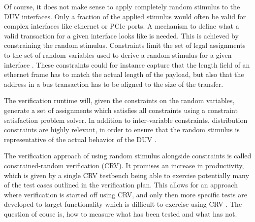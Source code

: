 Of course, it does not make sense to apply completely random stimulus to the DUV interfaces. Only a fraction of the
applied stimulus would often be valid for complex interfaces like ethernet or PCIe ports. A mechanism to define what
a valid transaction for a given interface looks like is needed. This is achieved by constraining the random stimulus.
Constraints limit the set of legal assignments to the set of random variables used to derive a random stimulus for a
given interface \cite[Ch. 3]{bergeron2012writing}. These constraints could for instance capture that the length field
of an ethernet frame has to match the actual length of the payload, but also that the address in a bus transaction
has to be aligned to the size of the transfer.

The verification runtime will, given the constraints on the random variables, generate a set of assignments which
satisfies all constraints using a constraint satisfaction problem solver. In addition to inter-variable
constraints, distribution constraints are highly relevant,
in order to ensure that the random stimulus is representative of the actual behavior of the DUV \cite[Sec. 7.5]{flake2020a}.

The verification approach of using random stimulus alongside constraints is called constrained-random verification
(CRV). It promises an increase in productivity, which is given by a single CRV testbench being able to exercise
potentially many of the test cases outlined in the verification plan. This allows for an approach where verification
is started off using CRV, and only then more specific tests are developed to target functionality which is difficult
to exercise using CRV \cite[Ch. 3]{bergeron2012writing}. The question of couse is, how to measure what has been
tested and what has not.

